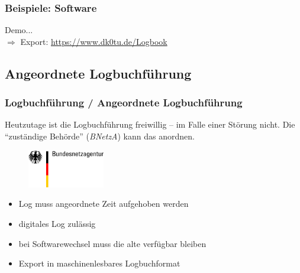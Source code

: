 \begin{frame}
  \frametitle{Beispiele: Software}

  \begin{center}

    \Large Demo... \\[3em]

    \normalsize $\Rightarrow$ Export: \ExternalLink\url{https://www.dk0tu.de/Logbook}

  \end{center}

\end{frame}

\subsection{Angeordnete Logbuchführung}

\begin{frame}
  \frametitle{Logbuchführung / Angeordnete Logbuchführung}

  Heutzutage ist die Logbuchführung freiwillig -- im Falle einer Störung nicht.
  Die ``zuständige Behörde'' (\emph{BNetzA}) kann das anordnen.

  \begin{center}
    \begin{figure}
      \includegraphics[width=0.3\textwidth,height=.3\textheight,keepaspectratio]{bv13/Bundesnetzagentur_logo_709px.png}
    \end{figure}
  \end{center}

  \begin{itemize}
    \item Log muss angeordnete Zeit aufgehoben werden
    \item digitales Log zulässig
    \item bei Softwarewechsel muss die alte verfügbar bleiben
    \item Export in maschinenlesbares Logbuchformat
  \end{itemize}

\end{frame}

